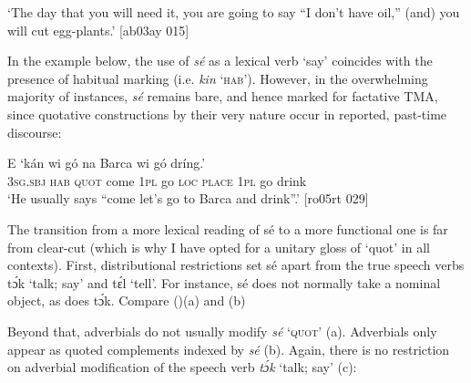 \glt ‘The day that you will need it, you are going to say “I don’t have oil,” (and) 
you will cut egg-plants.’ [ab03ay 015]
\z

In the example below, the use of \textit{sé} as a lexical verb ‘say’ coincides with the presence of habitual marking (i.e. \textit{kin} ‘\textsc{hab}’). However, in the overwhelming majority of instances, \textit{sé} remains bare, and hence marked for factative TMA, since quotative constructions by their very nature occur in reported, past-time discourse: 


\ea%
    \label{ex:key:1367}
    \gll E          ‘kán    wi  gó  na  Barca  wi  gó  dríng.’\\
\textsc{3sg.sbj}  \textsc{hab}  \textsc{quot}    come  \textsc{1pl}  go  \textsc{loc}  \textsc{place}  \textsc{1pl}  go  drink\\

\glt ‘He usually says “come let’s go to Barca and drink”.’ [ro05rt 029]
\z

The transition from a more lexical reading of sé to a more functional one is far from clear-cut (which is why I have opted for a unitary gloss of ‘quot’ in all contexts). First, distributional restrictions set sé apart from the true speech verbs tɔ́k ‘talk; say’ and tɛ́l ‘tell’. For instance, sé does not normally take a nominal object, as does tɔ́k. Compare ()(a) and (b)


\ea%
    \label{ex:key:1368}
\z\z

Beyond that, adverbials do not usually modify \textit{sé} ‘\textsc{quot}’ (a). Adverbials only appear as quoted complements indexed by \textit{sé} (b). Again, there is no restriction on adverbial modification of the speech verb \textit{tɔ́k} ‘talk; say’ (c): 


\ea%
    \label{ex:key:1369}
\z\z

